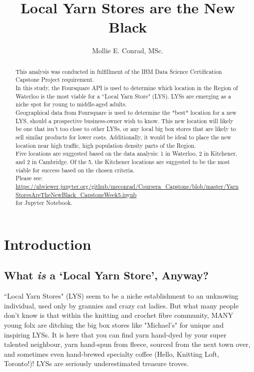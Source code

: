\documentclass[10pt,a4paper]{report}
\author{Mollie E. Conrad, MSc.}
\title{Local Yarn Stores are the New Black}
\begin{document}
	\maketitle
	
	\begin{abstract}
		
		\noindent This analysis was conducted in fulfillment of the IBM Data Science Certification Capstone Project requirement. \\
		
		\noindent In this study, the Foursquare API is used to determine which location in the Region of Waterloo is the most viable for a ``Local Yarn Store" (LYS). LYSs are emerging as a niche spot for young to middle-aged adults. \\
		
		\noindent Geographical data from Foursquare is used to determine the *best* location for a new LYS, should a prospective business-owner wish to know. This new location will likely be one that isn't too close to other LYSs, or any local big box stores that are likely to sell similar products for lower costs. Additionally, it would be ideal to place the new location near high traffic, high population density parts of the Region.\\
		
		\noindent Five locations are suggested based on the data analysis: 1 in Waterloo, 2 in Kitchener, and 2 in Cambridge. Of the 5, the Kitchener locations are suggested to be the most viable for success based on the chosen criteria.\\
		
	\noindent Please see:\\ \url{https://nbviewer.jupyter.org/github/meconrad/Coursera_Capstone/blob/master/YarnStoresAreTheNewBlack_CapstoneWeek5.ipynb}\\ for Jupyter Notebook.
	
	\end{abstract}

	\chapter{Introduction}
		\section{What \textit{is} a `Local Yarn Store',  Anyway?}
	``Local Yarn Stores" (LYS) seem to be a niche establishment to an unknowing individual, used only by grannies and crazy cat ladies. But what many people don't know is that within the knitting and crochet fibre community, MANY young folx are ditching the big box stores like "Michael's" for unique and inspiring LYSs. It is here that you can find yarn hand-dyed by your super talented neighbour, yarn hand-spun from fleece, sourced from the next town over, and sometimes even hand-brewed specialty coffee (Hello, Knitting Loft, Toronto!)! LYSs are seriously underestimated treasure troves.
	
\end{document}

